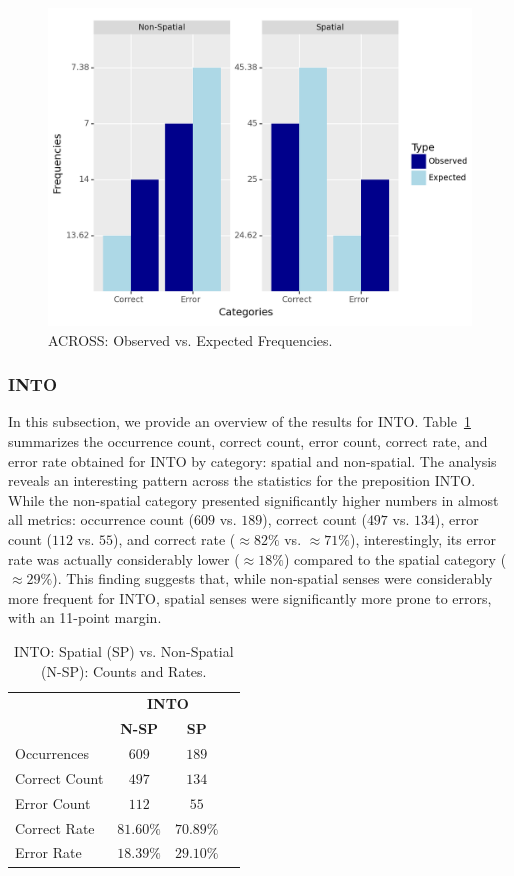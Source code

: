 \begin{figure}[htb]
        \centering
        \includegraphics[width=.8\textwidth]{textual/Figuras/Results/Unknown-65.png}
        \caption{ACROSS: Observed vs. Expected Frequencies.}
        \label{fig: schi-across}
\end{figure}


\subsubsection{INTO} 

In this subsection, we provide an overview of the results for INTO. Table~\ref{tab:into} summarizes the occurrence count, correct count, error count, correct rate, and error rate obtained for INTO by category: spatial and non-spatial. The analysis reveals an interesting pattern across the statistics for the preposition INTO. While the non-spatial category presented significantly higher numbers in almost all metrics: occurrence count ($609$ vs. $189$), correct count ($497$ vs. $134$), error count ($112$ vs. $55$), and correct rate ($\approx82\%$ vs. $\approx71\%$), interestingly, its error rate was actually considerably lower ($\approx18\%$) compared to the spatial category ($\approx29\%$). This finding suggests that, while non-spatial senses were considerably more frequent for INTO, spatial senses were significantly more prone to errors, with an 11-point margin.


\begin{table}[htb]
\centering
\begin{tabular}{@{}lccc@{}} \\
\toprule
& \multicolumn{2}{c}{\textbf{INTO}} \\ 
& \textbf{N-SP} & \textbf{SP} \\
\midrule
Occurrences & $609$ & $189$\\
Correct Count  & $497$ & $134$\\
Error Count & $112$ & $55$ \\
\midrule
Correct Rate & $\mathbf{81.60\%}$ & $70.89\%$\\
\midrule
Error Rate & $18.39\%$ & $\mathbf{29.10\%}$\\
\bottomrule
\end{tabular}
\caption{INTO: Spatial (SP) vs. Non-Spatial (N-SP): Counts and Rates.} \label{tab:into} 
\end{table}


